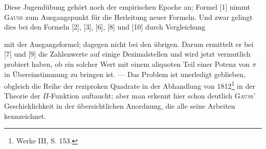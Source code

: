 \noindent Diese Jugendübung gehört noch der empirischen Epoche an; Formel [1]
nimmt \textsc{Gauss} zum Ausgangspunkt für die Herleitung neuer Formeln. Und
zwar gelingt dies bei den Formeln [2], [3], [6], [8] und [10] durch Vergleichung
\par\clearpage{}
\setcounter{footnote}{0}
\noindent mit der Ausgangsformel; dagegen nicht bei den übrigen. Darum ermittelt er bei [7] und [9] die Zahlenwerte auf einige Dezimalstellen und wird
jetzt vermutlich probiert haben, ob ein solcher Wert mit einem aliquoten
Teil einer Potenz von $\pi$ in Übereinstimmung zu bringen ist. — Das Problem
ist unerledigt geblieben, obgleich die Reihe der reziproken Quadrate in der
Abhandlung von 1812\footnote{Werke III, S. 153.} in der Theorie der $\Pi$-Funktion auftaucht; aber man
erkennt hier schon deutlich \textsc{Gauss}’ Geschicklichkeit in der übersichtlichen
Anordnung, die alle seine Arbeiten kennzeichnet.

